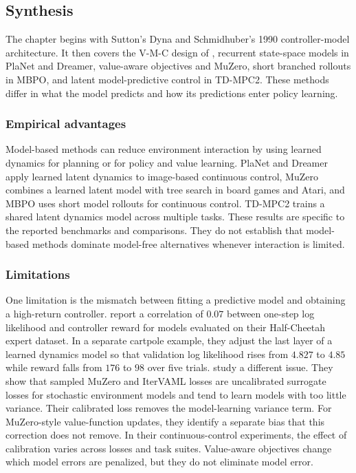 \subsection{Synthesis}
\label{section:fc_synthesis}

The chapter begins with Sutton's Dyna and Schmidhuber's 1990 controller-model architecture. It then covers the V-M-C design of \citet{HaSchmidhuber2018}, recurrent state-space models in PlaNet and Dreamer, value-aware objectives and MuZero, short branched rollouts in MBPO, and latent model-predictive control in TD-MPC2. These methods differ in what the model predicts and how its predictions enter policy learning.

\subsubsection{Empirical advantages}
\label{section:fc_synthesis_wins}

Model-based methods can reduce environment interaction by using learned dynamics for planning or for policy and value learning. PlaNet and Dreamer apply learned latent dynamics to image-based continuous control, MuZero combines a learned latent model with tree search in board games and Atari, and MBPO uses short model rollouts for continuous control. TD-MPC2 trains a shared latent dynamics model across multiple tasks. These results are specific to the reported benchmarks and comparisons. They do not establish that model-based methods dominate model-free alternatives whenever interaction is limited.

\subsubsection{Limitations}
\label{section:fc_synthesis_fails}

One limitation is the mismatch between fitting a predictive model and obtaining a high-return controller. \citet{Lambert2020} report a correlation of $0.07$ between one-step log likelihood and controller reward for models evaluated on their Half-Cheetah expert dataset. In a separate cartpole example, they adjust the last layer of a learned dynamics model so that validation log likelihood rises from $4.827$ to $4.85$ while reward falls from $176$ to $98$ over five trials. \citet{VoelckerCalib2025} study a different issue. They show that sampled MuZero and IterVAML losses are uncalibrated surrogate losses for stochastic environment models and tend to learn models with too little variance. Their calibrated loss removes the model-learning variance term. For MuZero-style value-function updates, they identify a separate bias that this correction does not remove. In their continuous-control experiments, the effect of calibration varies across losses and task suites. Value-aware objectives change which model errors are penalized, but they do not eliminate model error.

